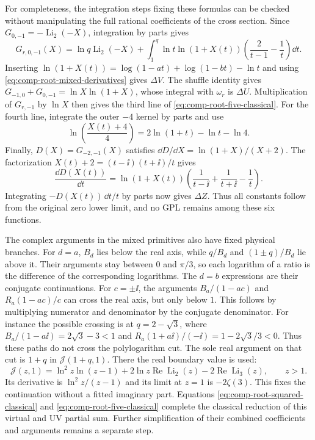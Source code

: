 For completeness, the integration steps fixing these formulas can be
checked without manipulating the full rational coefficients of the cross
section. Since $G_{0,-1}=-\operatorname{Li}_2(-X)$, integration by parts gives
\begin{equation}
 G_{r,0,-1}(X)=\ln q\operatorname{Li}_2(-X)
 +\int_1^q\ln t\ln(1+X(t))
       \left(\frac2{t-1}-\frac1t\right)\dd t.
\end{equation}
Inserting $\ln(1+X(t))=\log(1-at)+\log(1-bt)-\ln t$
and using \eqref{eq:comp-root-mixed-derivatives} gives $\Delta V$.
The shuffle identity gives
$G_{-1,0}+G_{0,-1}=\ln X\ln(1+X)$, whose integral with
$\omega_r$ is $\Delta U$. Multiplication of $G_{r,-1}$ by
$\ln X$ then gives the third line of
\eqref{eq:comp-root-five-classical}.
For the fourth line, integrate the outer $-4$ kernel by parts and use
\begin{equation}
 \ln\!\left(\frac{X(t)+4}{4}\right)
       =2\ln(1+t)-\ln t-\ln4.
\end{equation}
Finally, $D(X)=G_{-2,-1}(X)$ satisfies
$\dd D/\dd X=\ln(1+X)/(X+2)$. The factorization
$X(t)+2=(t-\ii)(t+\ii)/t$ gives
\begin{equation}
 \frac{\dd D(X(t))}{\dd t}
 =\ln(1+X(t))\left(\frac1{t-\ii}+\frac1{t+\ii}-\frac1t\right).
\end{equation}
Integrating $-D(X(t))\,\dd t/t$ by parts now gives $\Delta Z$.
Thus all constants follow from the original zero lower limit, and
no GPL remains among these six functions.

The complex arguments in the mixed primitives also have fixed physical
branches. For $d=a$, $B_d$ lies below the real axis, while
$q/B_d$ and $(1\pm q)/B_d$ lie above it. Their arguments stay
between $0$ and $\pi/3$, so each logarithm of a ratio is the
difference of the corresponding logarithms. The $d=b$ expressions
are their conjugate continuations. For $c=\pm\ii$, the arguments
$B_a/(1-ac)$ and $R_a(1-ac)/c$ can cross the real axis, but
only below $1$. This follows by multiplying numerator and denominator
by the conjugate denominator. For instance the possible crossing is
at $q=2-\sqrt3$, where $B_a/(1-a\ii)=2\sqrt3-3<1$ and
$R_a(1+a\ii)/(-\ii)=1-2\sqrt3/3<0$. Thus these paths do not cross the
polylogarithm cut. The sole real argument on that cut is $1+q$
in $\mathcal J(1+q,1)$. There the real boundary value is used:
\begin{equation}
 \mathcal J(z,1)=\ln^2z\ln(z-1)
 +2\ln z\operatorname{Re}\operatorname{Li}_2(z)
 -2\operatorname{Re}\operatorname{Li}_3(z),\qquad z>1.
\end{equation}
Its derivative is $\ln^2z/(z-1)$ and its limit at $z=1$ is
$-2\zeta(3)$. This fixes the continuation without a fitted imaginary
part. Equations \eqref{eq:comp-root-squared-classical} and
\eqref{eq:comp-root-five-classical} complete the classical reduction
of this virtual and UV partial sum. Further simplification of their
combined coefficients and arguments remains a separate step.

